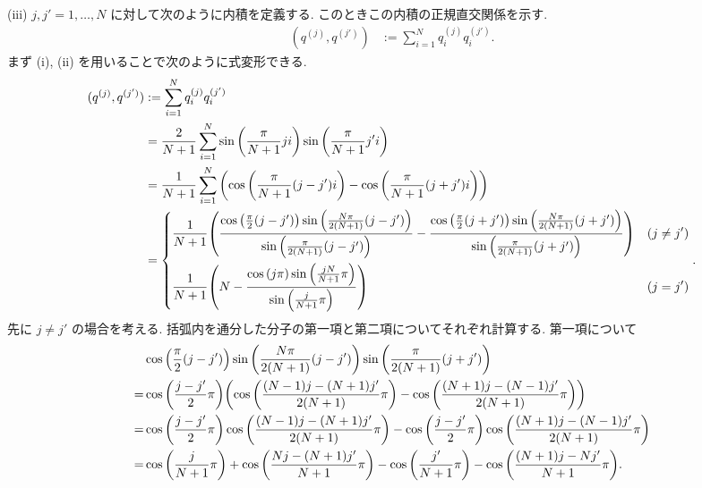 \documentclass[uplatex,dvipdfmx,a4paper,11pt]{jlreq}
\theoremstyle{definition}
\begin{document}
(iii) $j, j' = 1,\ldots,N$ に対して次のように内積を定義する. このときこの内積の正規直交関係を示す.
\begin{align}
  (q^{(j)}, q^{(j')}) & := \sum_{i = 1}^{N}q_i^{(j)}q_i^{(j')}.
\end{align}
まず (i), (ii) を用いることで次のように式変形できる.
\begin{align}
  (q^{(j)}, q^{(j')}) & := \sum_{i = 1}^{N}q_i^{(j)}q_i^{(j')}                                                                                                                                                                                                                                                 \\
                      & = \frac{2}{N+1}\sum_{i = 1}^{N}\sin\qty(\frac{\pi}{N+1}ji)\sin\qty(\frac{\pi}{N+1}j'i)                                                                                                                                                                                                 \\
                      & = \frac{1}{N+1}\sum_{i = 1}^{N}\qty(\cos\qty(\frac{\pi}{N+1}(j - j')i) - \cos\qty(\frac{\pi}{N+1}(j + j')i))                                                                                                                                                                           \\
                      & = \begin{dcases}
                            \frac{1}{N+1}\qty(\frac{\cos\qty(\frac{\pi}{2}(j - j'))\sin\qty(\frac{N\pi}{2(N+1)}(j - j'))}{\sin\qty(\frac{\pi}{2(N+1)}(j - j'))} - \frac{\cos\qty(\frac{\pi}{2}(j + j'))\sin\qty(\frac{N\pi}{2(N+1)}(j + j'))}{\sin\qty(\frac{\pi}{2(N+1)}(j + j'))}) & (j \neq j') \\
                            \frac{1}{N+1}\qty(N - \frac{\cos\qty(j\pi)\sin\qty(\frac{jN}{N+1}\pi)}{\sin\qty(\frac{j}{N+1}\pi)})                                                                                                                                                      & (j = j')
                          \end{dcases}.
\end{align}
先に $j \neq j'$ の場合を考える. 括弧内を通分した分子の第一項と第二項についてそれぞれ計算する. 第一項について
\begin{align}
    & \cos\qty(\frac{\pi}{2}(j - j'))\sin\qty(\frac{N\pi}{2(N+1)}(j - j'))\sin\qty(\frac{\pi}{2(N+1)}(j + j'))                                                       \\
  = & \cos\qty(\frac{j - j'}{2}\pi)\qty(\cos\qty(\frac{(N-1)j - (N+1)j'}{2(N+1)}\pi) - \cos\qty(\frac{(N+1)j - (N-1)j'}{2(N+1)}\pi))                                 \\
  = & \cos\qty(\frac{j - j'}{2}\pi)\cos\qty(\frac{(N-1)j - (N+1)j'}{2(N+1)}\pi) - \cos\qty(\frac{j - j'}{2}\pi)\cos\qty(\frac{(N+1)j - (N-1)j'}{2(N+1)}\pi)          \\
  = & \cos\qty(\frac{j}{N+1}\pi) + \cos\qty(\frac{Nj - (N+1)j'}{N+1}\pi) - \cos\qty(\frac{j'}{N+1}\pi) - \cos\qty(\frac{(N+1)j - Nj'}{N+1}\pi). \label{Q17-3. iii 1}
\end{align}
\end{document}
